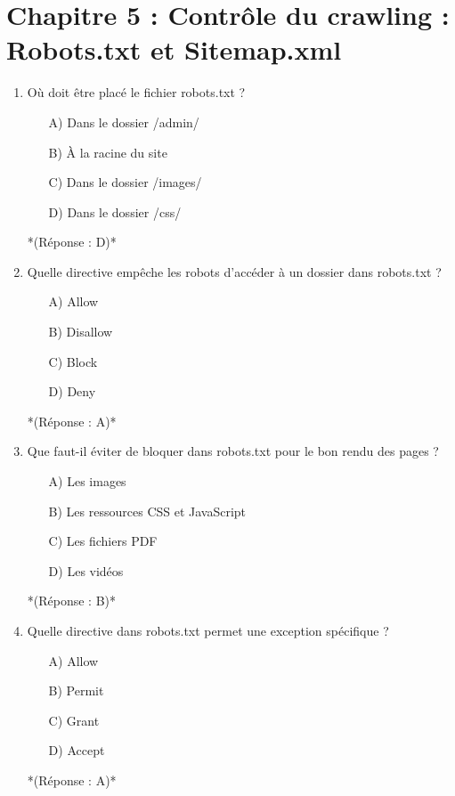 \documentclass[12pt,a4paper,twoside]{report}
\begin{document}
\newpage

\section*{Chapitre 5 : Contrôle du crawling : Robots.txt et Sitemap.xml}

\begin{enumerate}
\item Où doit être placé le fichier robots.txt ?
\begin{itemize}
\item[A)] Dans le dossier /admin/
\item[B)] À la racine du site
\item[C)] Dans le dossier /images/
\item[D)] Dans le dossier /css/
\end{itemize}
*(Réponse : D)*

\item Quelle directive empêche les robots d'accéder à un dossier dans robots.txt ?
\begin{itemize}
\item[A)] Allow
\item[B)] Disallow
\item[C)] Block
\item[D)] Deny
\end{itemize}
*(Réponse : A)*

\item Que faut-il éviter de bloquer dans robots.txt pour le bon rendu des pages ?
\begin{itemize}
\item[A)] Les images
\item[B)] Les ressources CSS et JavaScript
\item[C)] Les fichiers PDF
\item[D)] Les vidéos
\end{itemize}
*(Réponse : B)*

\item Quelle directive dans robots.txt permet une exception spécifique ?
\begin{itemize}
\item[A)] Allow
\item[B)] Permit
\item[C)] Grant
\item[D)] Accept
\end{itemize}
*(Réponse : A)*


\end{enumerate}
\end{document}
